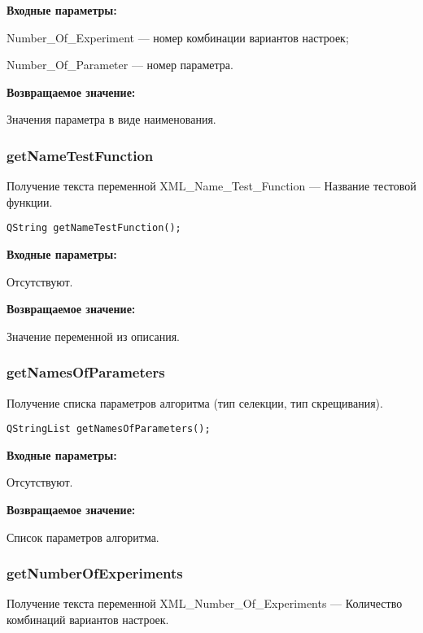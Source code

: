 \documentclass[a4paper,12pt]{article}
\begin{document}
\textbf{Входные параметры:}

Number\_Of\_Experiment --- номер комбинации вариантов настроек;
 
    Number\_Of\_Parameter --- номер параметра.

\textbf{Возвращаемое значение:}

Значения параметра в виде наименования.


\subsubsection{getNameTestFunction}\label{getNameTestFunction}

Получение текста переменной  XML\_Name\_Test\_Function --- Название тестовой функции.


\begin{lstlisting}[label=code_syntax_getNameTestFunction,caption=Синтаксис]
QString getNameTestFunction();
\end{lstlisting}

\textbf{Входные параметры:}

Отсутствуют.

\textbf{Возвращаемое значение:}

Значение переменной из описания.


\subsubsection{getNamesOfParameters}\label{getNamesOfParameters}

Получение списка параметров алгоритма (тип селекции, тип скрещивания).


\begin{lstlisting}[label=code_syntax_getNamesOfParameters,caption=Синтаксис]
QStringList getNamesOfParameters();
\end{lstlisting}

\textbf{Входные параметры:}

Отсутствуют.

\textbf{Возвращаемое значение:}

Список параметров алгоритма.


\subsubsection{getNumberOfExperiments}\label{getNumberOfExperiments}

Получение текста переменной  XML\_Number\_Of\_Experiments --- Количество комбинаций вариантов настроек.
\end{document}
